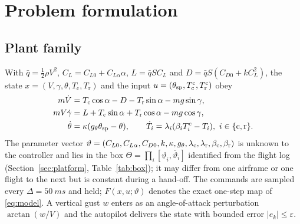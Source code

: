 \section{Problem formulation}\label{sec:problem}
\subsection{Plant family}
With $\bar q=\tfrac12\rho V^2$, $C_L=C_{L0}+C_{L\alpha}\alpha$, $L=\bar qSC_L$ and $D=\bar qS(C_{D0}+kC_L^2)$, the state $x=(V,\gamma,\theta,T_{\mathrm c},T_{\mathrm r})$ and the input $u=(\theta_{\mathrm{sp}},T^{\mathrm c}_{\mathrm c},T^{\mathrm c}_{\mathrm r})$ obey
\begin{subequations}\label{eq:model}
\begin{align}
m\dot V&=T_{\mathrm c}\cos\alpha-D-T_{\mathrm r}\sin\alpha-mg\sin\gamma,\label{eq:V}\\
mV\dot\gamma&=L+T_{\mathrm c}\sin\alpha+T_{\mathrm r}\cos\alpha-mg\cos\gamma,\label{eq:gam}\\
\dot\theta&=\kappa(g_\theta\theta_{\mathrm{sp}}-\theta),\qquad\dot T_i=\lambda_i(\beta_iT^{\mathrm c}_i-T_i),\ i\in\{\mathrm c,\mathrm r\}.\label{eq:fast}
\end{align}
\end{subequations}
The parameter vector $\vartheta=(C_{L0},C_{L\alpha},C_{D0},k,\kappa,g_\theta,\lambda_{\mathrm c},\lambda_{\mathrm r},\beta_{\mathrm c},\beta_{\mathrm r})$ is unknown to the controller and lies in the box $\Theta=\prod_i[\underline\vartheta_i,\overline\vartheta_i]$ identified from the flight log (Section~\ref{sec:platform}, Table~\ref{tab:box}); it may differ from one airframe or one flight to the next but is constant during a hand-off. The commands are sampled every $\Delta=\SI{50}{ms}$ and held; $F(x,u;\vartheta)$ denotes the exact one-step map of \eqref{eq:model}. A vertical gust $w$ enters as an angle-of-attack perturbation $\arctan(w/V)$ and the autopilot delivers the state with bounded error $|e_k|\le\varepsilon$.

